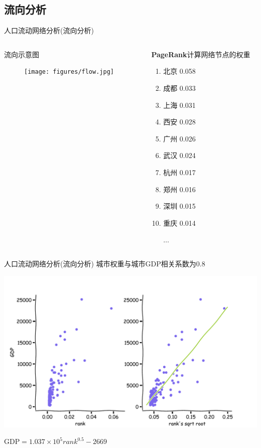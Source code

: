 \subsection{流向分析}

\begin{frame}[t]{人口流动网络分析(流向分析)}
    \begin{columns}
        \begin{column}{0.4 \textwidth}
            \alert{流向示意图}

            \begin{figure}
                \texttt{[image: figures/flow.jpg]}
            \end{figure}
        \end{column}

        \pause
        \begin{column}{0.6 \textwidth}
            \textbf{PageRank}计算网络节点的权重

            \begin{enumerate}
                \item 北京 0.058
                \item 成都 0.033
                \item 上海 0.031
                \item 西安 0.028
                \item 广州 0.026
                \item 武汉 0.024
                \item 杭州 0.017
                \item 郑州 0.016
                \item 深圳 0.015
                \item 重庆 0.014

                $\ldots$
            \end{enumerate}
        \end{column}
    \end{columns}
\end{frame}


\begin{frame}[t]{人口流动网络分析(流向分析)}
    城市权重与城市GDP相关系数为0.8

    \pause
    \includegraphics[scale=0.4]{figures/rank_gdp_scatter.pdf}

    $\text{GDP} = 1.037\times 10^5 rank^{0.5}-2669$
\end{frame}

